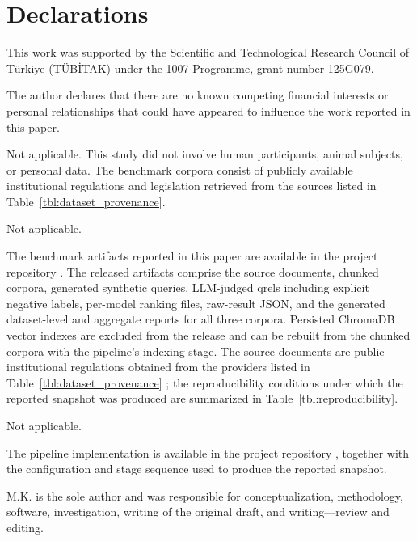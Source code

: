\backmatter

\section*{Declarations}


This work was supported by the Scientific and Technological Research Council of
T\"urkiye (T\"UB\.ITAK) under the 1007 Programme, grant number 125G079.


The author declares that there are no known competing financial interests or personal
relationships that could have appeared to influence the work reported in this paper.


Not applicable. This study did not involve human participants, animal subjects, or personal
data. The benchmark corpora consist of publicly available institutional regulations and
legislation retrieved from the sources listed in Table~\ref{tbl:dataset_provenance}.


Not applicable.


The benchmark artifacts reported in this paper are available in the project repository
\citep{GitHub_RagRetrievalBench}. The released artifacts comprise the source documents,
chunked corpora, generated synthetic queries, LLM-judged qrels including explicit negative
labels, per-model ranking files, raw-result JSON, and the generated dataset-level and
aggregate reports for all three corpora. Persisted ChromaDB vector indexes are excluded from
the release and can be rebuilt from the chunked corpora with the pipeline's indexing stage.
The source documents are public institutional regulations obtained from the providers listed
in Table~\ref{tbl:dataset_provenance} \citep{TED_Regulations, BDDK_Mevzuat}; the
reproducibility conditions under which the reported snapshot was produced are summarized in
Table~\ref{tbl:reproducibility}.


Not applicable.


The pipeline implementation is available in the project repository
\citep{GitHub_RagRetrievalBench}, together with the configuration and stage sequence used to
produce the reported snapshot.


M.K. is the sole author and was responsible for conceptualization, methodology, software,
investigation, writing of the original draft, and writing---review and editing.
